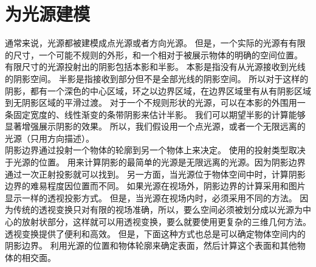\section{为光源建模}
通常来说，光源都被建模成点光源或者方向光源。
但是，一个实际的光源有有限的尺寸，一个可能不规则的外形，和一个相对于被展示物体的明确的空间位置。
有限尺寸的光源投射出的阴影包括本影和半影。
本影是指没有从光源接收到光线的阴影空间。
半影是指接收到部分但不是全部光线的阴影空间。
所以对于这样的阴影，都有一个深色的中心区域，环之以边界区域，在边界区域里有从有阴影区域到无阴影区域的平滑过渡。
对于一个不规则形状的光源，可以在本影的外围用一条固定宽度的、线性渐变的条带阴影来估计半影。
我们可以期望半影的计算能够显著增强展示阴影的效果。
所以，我们假设用一个点光源，或者一个无限远离的光源（只用方向描述）。\\
阴影边界通过投射一个物体的轮廓到另一个物体上来决定。
使用的投射类型取决于光源的位置。
用来计算阴影的最简单的光源是无限远离的光源。因为阴影边界通过一次正射投影就可以找到。
另一方面，当光源位于物体空间中时，计算阴影边界的难易程度因位置而不同。
如果光源在视场外，阴影边界的计算采用和图片显示一样的透视投影方式。
但是，当光源在视场内时，必须采用不同的方法。
因为传统的透视变换只对有限的视场准确，所以，要么空间必须被划分成以光源为中心的放射状部分，这样就可以用透视变换，要么就要使用更复杂的三维几何方法。\\
透视变换提供了便利和高效。
但是，下面这种方式也总是可以确定物体空间内的阴影边界。
利用光源的位置和物体轮廓来确定表面，然后计算这个表面和其他物体的相交面。